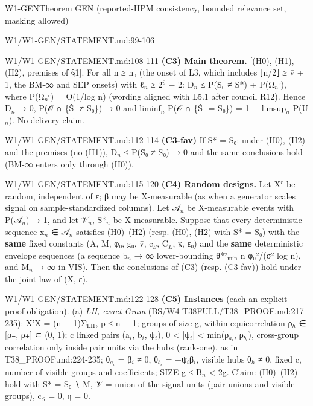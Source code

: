 \begin{card}{W1-GEN}{Theorem GEN (reported-HPM consistency, bounded relevance set, masking allowed)}
\begin{stmt}{W1/W1-GEN/STATEMENT.md:99-106}
\end{stmt}
\begin{stmt}{W1/W1-GEN/STATEMENT.md:108-111}
\textbf{(C3) Main theorem.} [(H0), (H1), (H2), premises of §1]. For all n ≥ n₀ (the onset of L3, which includes
⌊n/2⌋ ≥ v̄ + 1, the BM-∞ and SEP onsets) with ℓ$_{n}$ ≥ 2$^{\bar{v}}$ − 2: D$_{n}$ ≤ P(S̃₀ ≠ S*) + P(Ω$_{n}$ᶜ), where
P(Ω$_{n}$ᶜ) = O(1/log n) (wording aligned with L5.1 after council R12). Hence D$_{n}$ → 0, P(𝒪 ∩ \{Ŝ⁺ ≠ S₀\}) → 0 and
liminf$_{n}$ P(𝒪 ∩ \{Ŝ⁺ = S₀\}) = 1 − limsup$_{n}$ P(U$_{n}$). No delivery claim.
\end{stmt}
\begin{stmt}{W1/W1-GEN/STATEMENT.md:112-114}
\textbf{(C3-fav)} If S* = S₀: under (H0), (H2) and the premises (no (H1)), D$_{n}$ ≤ P(S̃₀ ≠ S₀) → 0 and the same conclusions
hold (BM-∞ enters only through (H0)).
\end{stmt}
\begin{stmt}{W1/W1-GEN/STATEMENT.md:115-120}
\textbf{(C4) Random designs.} Let X$^{r}$ be random, independent of ε; β may be X-measurable (as when a generator scales
signal on sample-standardized columns). Let 𝒜$_{n}$ be X-measurable events with P(𝒜$_{n}$) → 1, and let 𝒱$_{n}$, S*$_{n}$ be
X-measurable. Suppose that every deterministic sequence x$_{n}$ ∈ 𝒜$_{n}$ satisfies (H0)–(H2) (resp. (H0), (H2) with
S* = S₀) with the \textbf{same} fixed constants (A, M, φ₀, g₀, v̄, c$_{S}$, C$_{L}$, κ, ε₀) and the \textbf{same} deterministic
envelope sequences (a sequence b$_{n}$ → ∞ lower-bounding θ*²$_{\mathrm{min}}$ n φ₀²/(σ² log n), and M$_{n}$ → ∞ in VIS). Then the
conclusions of (C3) (resp. (C3-fav)) hold under the joint law of (X, ε).
\end{stmt}
\begin{stmt}{W1/W1-GEN/STATEMENT.md:122-128}
\textbf{(C5) Instances} (each an explicit proof obligation).
(a) \emph{LH, exact Gram} (BS/W4-T38FULL/T38\_PROOF.md:217-235): X'X = (n − 1)Σ$_{\mathrm{LH}}$, p ≤ n − 1; groups of size g, within
equicorrelation ρ$_{h}$ ∈ [ρ₋, ρ₊] ⊂ (0, 1); c linked pairs (a$_{i}$, b$_{i}$, ψ$_{i}$), 0 < |ψ$_{i}$| < min(ρ$_{a_i}$, ρ$_{b_i}$), cross-group
correlation only inside pair units via the hubs (rank-one), as in T38\_PROOF.md:224-235; θ$_{a_i}$ = β$_{i}$ ≠ 0,
θ$_{b_i}$ = −ψ$_{i}$β$_{i}$, visible hubs θ$_{h}$ ≠ 0, fixed c, number of visible groups and coefficients; SIZE g ≤ B$_{n}$ < 2g. Claim:
(H0)–(H2) hold with S* = S₀ ∖ M, 𝒱 = union of the signal units (pair unions and visible groups), c$_{S}$ = 0, η = 0.

\end{stmt}
\end{card}
